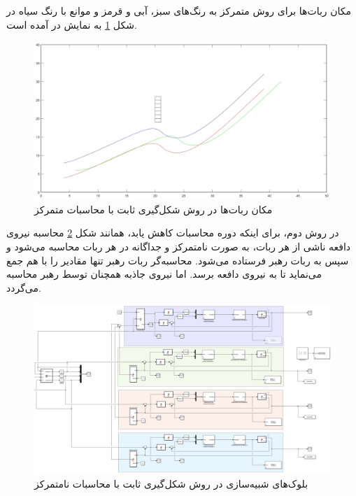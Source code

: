 مکان ربات‌ها برای روش متمرکز به رنگ‌های سبز، آبی و قرمز و موانع با رنگ سیاه در شکل \ref{Fig platoon-potential-field-pos} به نمایش در آمده است.
\begin{figure}[!h]
	\centering
	\includegraphics[scale=0.2]{Images/platoon-potential-field-pos.jpg}
	\caption{مکان ربات‌ها در روش شکل‌گیری ثابت با محاسبات متمرکز}\label{Fig platoon-potential-field-pos}
\end{figure}

در روش دوم، برای اینکه دوره محاسبات کاهش یابد، همانند شکل \ref{Fig platoon-potential-field-distributed-simulink} محاسبه نیروی دافعه ناشی از هر ربات، به صورت نامتمرکز و جداگانه در هر ربات محاسبه می‌شود و سپس به ربات رهبر فرستاده می‌شود. محاسبه‌گر ربات رهبر تنها مقادیر را با هم جمع می‌نماید تا به نیروی دافعه برسد. اما نیروی جاذبه همچنان توسط رهبر محاسبه می‌گردد.
\begin{figure}[!h]
	\centering
	\includegraphics[scale=0.25]{Images/platoon-potential-field-distributed-simulink.png}
	\caption{بلوک‌های شبیه‌سازی در روش شکل‌گیری ثابت با محاسبات نامتمرکز}\label{Fig platoon-potential-field-distributed-simulink}
\end{figure}



